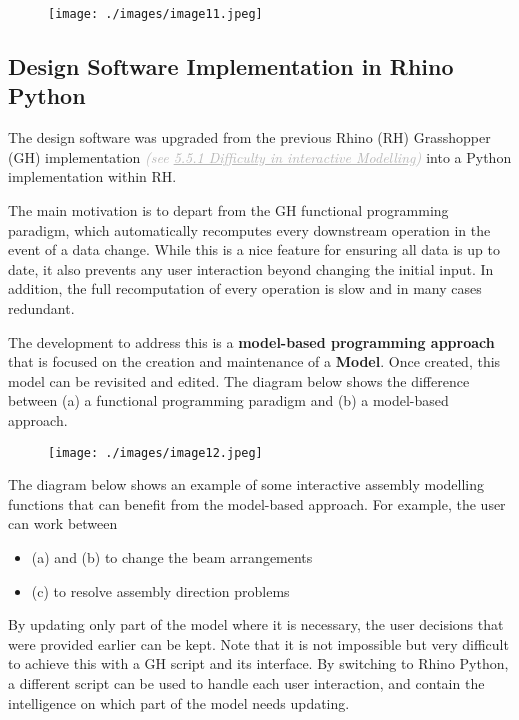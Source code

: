 \begin{figure}[H]
\texttt{[image: ./images/image11.jpeg]}
\end{figure}


\subsection{Design Software Implementation in Rhino Python}

The design software was upgraded from the previous Rhino (RH) Grasshopper (GH) implementation \textit{\textcolor[HTML]{B7B7B7}{(see \uline{5.5.1 Difficulty in interactive Modelling}) }}into a Python implementation within RH.

The main motivation is to depart from the GH functional programming paradigm, which automatically recomputes every downstream operation in the event of a data change. While this is a nice feature for ensuring all data is up to date, it also prevents any user interaction beyond changing the initial input. In addition, the full recomputation of every operation is slow and in many cases redundant.

The development to address this is a \textbf{model-based programming approach} that is focused on the creation and maintenance of a \textbf{Model}. Once created, this model can be revisited and edited. The diagram below shows the difference between (a) a functional programming paradigm and (b) a model-based approach.

\begin{figure}[H]
\texttt{[image: ./images/image12.jpeg]}
\end{figure}


The diagram below shows an example of some interactive assembly modelling functions that can benefit from the model-based approach. For example, the user can work between

\begin{itemize}
	\item (a) and (b) to change the beam arrangements

	\item (c) to resolve assembly direction problems

\end{itemize}
By updating only part of the model where it is necessary, the user decisions that were provided earlier can be kept. Note that it is not impossible but very difficult to achieve this with a GH script and its interface. By switching to Rhino Python, a different script can be used to handle each user interaction, and contain the intelligence on which part of the model needs updating.

